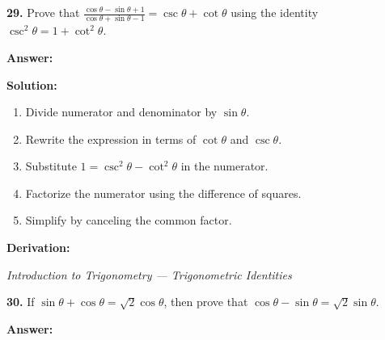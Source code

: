 \documentclass[12pt,a4paper]{exam}
\newcommand{\fitmath}[1]{%
  \sbox{\schmathbox}{$\displaystyle #1$}%
  \ifdim\wd\schmathbox>\linewidth
    \resizebox{\linewidth}{!}{\usebox{\schmathbox}}%
  \else
    \usebox{\schmathbox}%
  \fi}
\begin{document}
\begin{questions}
\question \textbf{29.} Prove that $\frac{\cos \theta - \sin \theta + 1}{\cos \theta + \sin \theta - 1} = \csc \theta + \cot \theta$ using the identity $\csc^2 \theta = 1 + \cot^2 \theta$.

\textbf{Answer:}
\begin{center}
\fitmath{\csc \theta + \cot \theta}
\end{center}

\textbf{Solution:}
\begin{enumerate}
  \item Divide numerator and denominator by $\sin \theta$.
  \item Rewrite the expression in terms of $\cot \theta$ and $\csc \theta$.
  \item Substitute $1 = \csc^2 \theta - \cot^2 \theta$ in the numerator.
  \item Factorize the numerator using the difference of squares.
  \item Simplify by canceling the common factor.
\end{enumerate}
\textbf{Derivation:}
\begin{center}
\fitmath{\frac{\cot \theta - 1 + \csc \theta}{\cot \theta + 1 - \csc \theta} = \frac{\cot \theta + \csc \theta - (\csc^2 \theta - \cot^2 \theta)}{\cot \theta - \csc \theta + 1} = \frac{(\cot \theta + \csc \theta) - (\csc \theta - \cot \theta)(\csc \theta + \cot \theta)}{\cot \theta - \csc \theta + 1} = \frac{(\cot \theta + \csc \theta)(1 - \csc \theta + \cot \theta)}{\cot \theta - \csc \theta + 1} = \cot \theta + \csc \theta}
\end{center}
\hfill \textit{Introduction to Trigonometry — Trigonometric Identities}
\vspace{0.3cm}

\question \textbf{30.} If $\sin \theta + \cos \theta = \sqrt{2} \cos \theta$, then prove that $\cos \theta - \sin \theta = \sqrt{2} \sin \theta$.

\textbf{Answer:}
\begin{center}
\fitmath{\text{Proof}}
\end{center}


\end{questions}
\end{document}
